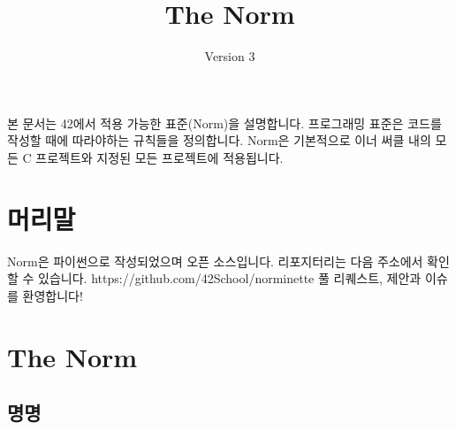 \documentclass{42-ko}
\begin{document}
\title{The Norm}
\subtitle{Version 3}

\summary
{
    본 문서는 42에서 적용 가능한 표준(Norm)을 설명합니다.
    프로그래밍 표준은 코드를 작성할 때에 따라야하는 규칙들을 정의합니다.
    Norm은 기본적으로 이너 써클 내의 모든 C 프로젝트와
    지정된 모든 프로젝트에 적용됩니다.
}

\maketitle

\tableofcontents



\chapter{머리말}

    Norm은 파이썬으로 작성되었으며 오픈 소스입니다.
    리포지터리는 다음 주소에서 확인할 수 있습니다.
    https://github.com/42School/norminette
    풀 리퀘스트, 제안과 이슈를 환영합니다!

\chapter{The Norm}


    \section{명명}
\end{document}
